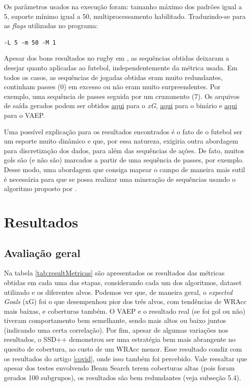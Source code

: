 \documentclass{article}
\begin{document}
Os parâmetros usados na execução foram: tamanho máximo dos padrões igual a 5,
suporte mínimo igual a 50, multiprocessamento habilitado. Traduzindo-se para as
\textit{flags} utilizadas no programa:

\begin{center}
	\texttt{-L 5 -m 50 -M 1}
\end{center}

Apesar dos bons resultados no rugby em \cite{bunker2021supervised}, as sequências obtidas deixaram a desejar
quanto aplicadas ao futebol, independentemente da métrica usada. Em todos os
casos, as sequências de jogadas obtidas eram muito redundantes, continham passes
(0) em excesso ou não eram muito surpreendentes. Por exemplo, uma sequência de
passes seguida por um cruzamento (7). Os arquivos de saída gerados podem ser
obtidos
\href{https://github.com/lframosferreira/projeto-ad/blob/main/results/supervised-sequential-pattern-rugby/results_xg.csv}{aqui}
para o \textit{xG},
\href{https://github.com/lframosferreira/projeto-ad/blob/main/results/supervised-sequential-pattern-rugby/results_binary.csv}{aqui}
para o binário e
\href{https://github.com/lframosferreira/projeto-ad/blob/main/results/supervised-sequential-pattern-rugby/results_vaep.csv}{aqui}
para o VAEP.

Uma possível explicação para os resultados encontrados é o fato de o futebol ser
um esporte muito dinâmico e que, por essa natureza, exigiria outra abordagem
para discretização dos dados, para além das sequências de ações. De fato, muitos
gols são (e não são) marcados a partir de uma sequência de passes, por exemplo.
Desse modo, uma abordagem que consiga mapear o campo de maneira mais sutil é
necessária para que se possa realizar uma mineração de sequências usando o
algoritmo proposto por \cite{bunker2021supervised}.

\section{Resultados}

\subsection{Avaliação geral}

Na tabela \ref{tab:resultMetricas} são apresentados os resultados das métricas obtidas 
em cada uma das etapas, considerando cada um dos algoritmos, dataset utilizado e os diferentes 
alvos. Podemos ver que, de maneira geral, o \textit{expected Goals} (xG) foi o que desempenhou 
pior dos três alvos, com tendências de WRAcc mais baixas, e coberturas também. O VAEP e o resultado 
real (se foi gol ou não) tiveram comportamento bem semelhante, sendo mais altos ou baixo juntos 
(indicando uma certa correlação). Por fim, apesar de algumas variações nos resultados, o SSD++ 
demonstrou ser uma estratégia bem  mais abrangente no quesito de cobertura, ao custo de um WRAcc 
menor. Esse resultado condiz com os resultados do artigo \ref{covid}, onde isso também foi percebido. 
Vale ressaltar que apesar dos testes envolvendo Beam Search terem coberturas altas (pois foram 
gerados 100 subgrupos), os resultados são bem redundantes (veja subseção 5.4).
\end{document}
